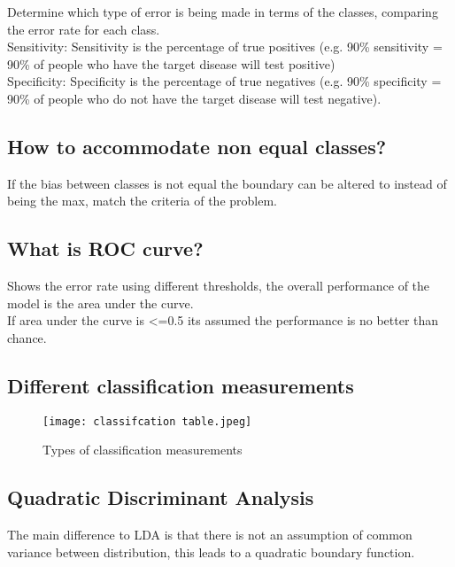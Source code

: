 \documentclass[11pt]{scrartcl} %
\begin{document}
Determine which type of error is being made in terms of the classes, comparing the error rate for
each class.\\

Sensitivity: Sensitivity is the percentage of true positives (e.g. 90\% sensitivity = 90\% of people who have the target disease will test positive)\\
Specificity: Specificity is the percentage of true negatives (e.g. 90\% specificity = 90\% of people who do not have the target disease will test negative).

\subsection{How to accommodate non equal classes?}

If the bias between classes is not equal the boundary can be altered to instead of being the max,
match the criteria of the problem.

\subsection{What is ROC curve?}

Shows the error rate using different thresholds, the overall performance of the model is the
area under the curve.\\

If area under the curve is <=0.5 its assumed the performance is no better than chance.

\subsection{Different classification measurements}

\begin{figure}[h] %
	\centering
	\texttt{[image: classifcation table.jpeg]} %
	\caption{Types of classification measurements}
\end{figure}

\subsection{Quadratic Discriminant Analysis}

The main difference to LDA is that there is not an assumption of common variance between distribution,
this leads to a quadratic boundary function. 
\end{document}
